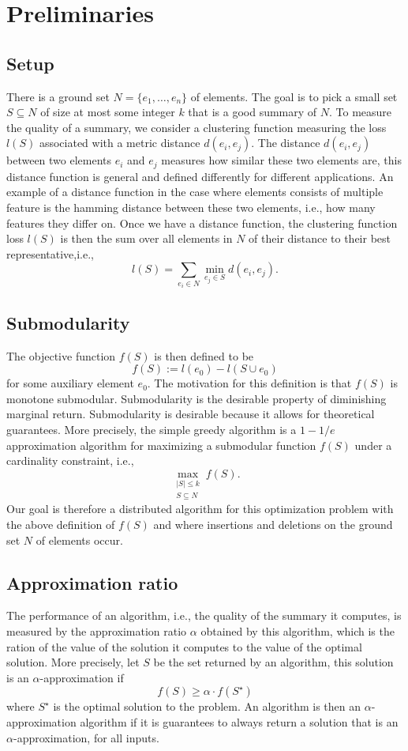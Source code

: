 \section{Preliminaries}
\label{s:prelim}
\subsection{Setup} There is a ground set $N = \{e_1, \ldots, e_n\}$ of elements. The goal is to pick a small set $S \subseteq N$ of size at most some integer $k$ that is a good summary of $N$. To measure the quality of a summary, we consider a clustering function measuring the loss $l(S)$ associated with a metric distance $d(e_i, e_j)$. The distance $d(e_i, e_j)$ between two elements $e_i$ and $e_j$ measures how similar these two elements are, this distance function is general and defined differently for different applications. An example of a distance function in the case where elements consists of multiple feature is the hamming distance between these two elements, i.e., how many features they differ on. Once we have a distance function, the clustering function loss $l(S)$ is then the sum over all elements in  $N$ of their distance to their best representative,i.e.,
%
$$l(S) = \sum_{e_i \in N} \min_{e_j \in S} d(e_i, e_j).$$
%



\subsection{Submodularity}
The objective function $f(S)$ is then defined to be 
%
$$f(S) := l(e_0) - l(S \cup e_0)$$
%
 for some auxiliary element $e_0$. The motivation for this definition is that $f(S)$ is monotone submodular. Submodularity is the desirable property of diminishing marginal return. Submodularity is desirable because it allows for theoretical guarantees. More precisely, the simple greedy algorithm is a $1-1/e$ approximation algorithm for maximizing a submodular function $f(S)$ under a cardinality constraint, i.e., 
 $$
 \max_{\substack{|S| \leq k \\ S \subseteq N}}f(S).
 $$
 Our goal is therefore a distributed algorithm for this optimization problem with the above definition of $f(S)$ and where insertions and deletions on the ground set $N$ of elements occur.

\subsection{Approximation ratio} The performance of an algorithm, i.e., the quality of the summary it computes, is measured by the approximation ratio $\alpha$ obtained by this algorithm, which is the ration of the value of the solution it computes to the value of the optimal solution. More precisely, let $S$ be the set returned by an algorithm, this solution is an $\alpha$-approximation if 
%
$$f(S) \geq \alpha \cdot f(S^\star)$$
%
where $S^{\star}$ is the optimal solution to the problem. An algorithm is then an $\alpha$-approximation algorithm if it is guarantees to always return a solution that is an $\alpha$-approximation, for all inputs.

